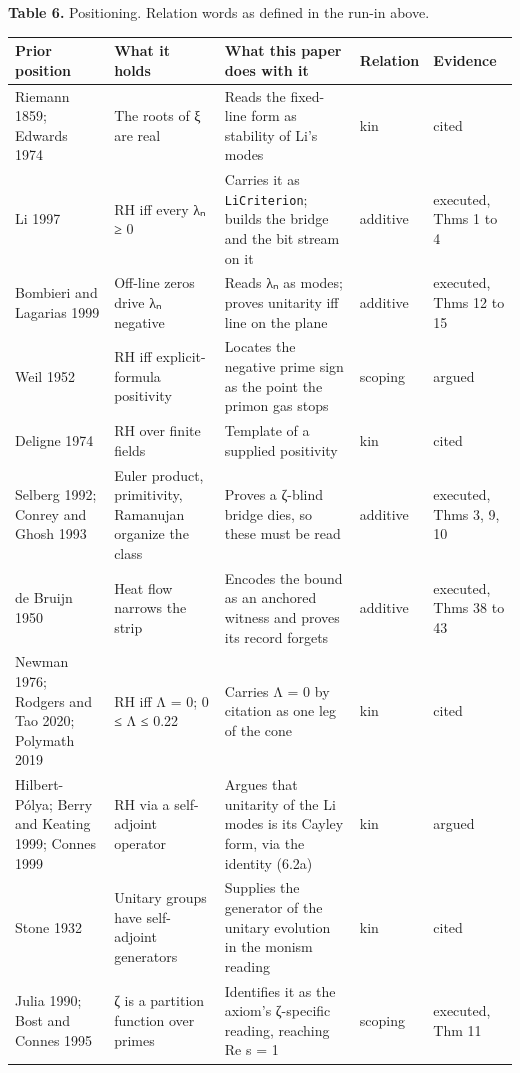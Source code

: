\documentclass[10pt]{article}
\begin{document}
\begin{table}[!htbp]
\centering\small
\renewcommand{\arraystretch}{1.12}
\raggedright \textbf{Table 6.} Positioning. Relation words as defined in the run-in above.\par\smallskip
\begin{tabularx}{\textwidth}{@{}P{0.18\textwidth} P{0.19\textwidth} L P{0.115\textwidth} P{0.115\textwidth}@{}}
\toprule
\textbf{Prior position} & \textbf{What it holds} & \textbf{What this paper does with it} & \textbf{Relation} & \textbf{Evidence} \\
\midrule
Riemann 1859; Edwards 1974 & The roots of ξ are real & Reads the fixed-line form as stability of Li's modes & kin & cited \\
Li 1997 & RH iff every λₙ ≥ 0 & Carries it as \texttt{LiCriterion}; builds the bridge and the bit stream on it & additive & executed, Thms 1 to 4 \\
Bombieri and Lagarias 1999 & Off-line zeros drive λₙ negative & Reads λₙ as modes; proves unitarity iff line on the plane & additive & executed, Thms 12 to 15 \\
Weil 1952 & RH iff explicit-formula positivity & Locates the negative prime sign as the point the primon gas stops & scoping & argued \\
Deligne 1974 & RH over finite fields & Template of a supplied positivity & kin & cited \\
Selberg 1992; Conrey and Ghosh 1993 & Euler product, primitivity, Ramanujan organize the class & Proves a ζ-blind bridge dies, so these must be read & additive & executed, Thms 3, 9, 10 \\
de Bruijn 1950 & Heat flow narrows the strip & Encodes the bound as an anchored witness and proves its record forgets & additive & executed, Thms 38 to 43 \\
Newman 1976; Rodgers and Tao 2020; Polymath 2019 & RH iff Λ = 0; 0 ≤ Λ ≤ 0.22 & Carries Λ = 0 by citation as one leg of the cone & kin & cited \\
Hilbert-Pólya; Berry and Keating 1999; Connes 1999 & RH via a self-adjoint operator & Argues that unitarity of the Li modes is its Cayley form, via the identity (6.2a) & kin & argued \\
Stone 1932 & Unitary groups have self-adjoint generators & Supplies the generator of the unitary evolution in the monism reading & kin & cited \\
Julia 1990; Bost and Connes 1995 & ζ is a partition function over primes & Identifies it as the axiom's ζ-specific reading, reaching Re s = 1 & scoping & executed, Thm 11 \\

\end{tabularx}
\end{table}
\end{document}
